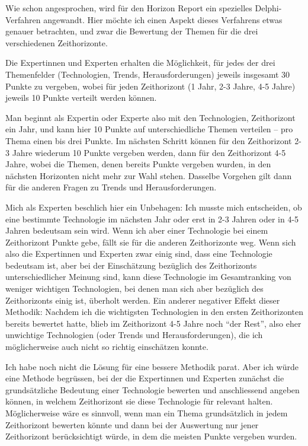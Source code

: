 \documentclass[a4paper,
fontsize=11pt,
oneside,
numbers=noperiodatend,
parskip=half-,
bibliography=totoc,
final
]{scrartcl}
\begin{document}
Wie schon angesprochen, wird für den Horizon Report ein spezielles
Delphi-Verfahren angewandt. Hier möchte ich einen Aspekt dieses
Verfahrens etwas genauer betrachten, und zwar die Bewertung der Themen
für die drei verschiedenen Zeithorizonte.

Die Expertinnen und Experten erhalten die Möglichkeit, für jedes der
drei Themenfelder (Technologien, Trends, Herausforderungen) jeweils
insgesamt 30 Punkte zu vergeben, wobei für jeden Zeithorizont (1 Jahr,
2-3 Jahre, 4-5 Jahre) jeweils 10 Punkte verteilt werden können.~

Man beginnt als Expertin oder Experte also mit den Technologien,
Zeithorizont ein Jahr, und kann hier 10 Punkte auf unterschiedliche
Themen verteilen -- pro Thema einen bis drei Punkte. Im nächsten Schritt
können für den Zeithorizont 2-3 Jahre wiederum 10 Punkte vergeben
werden, dann für den Zeithorizont 4-5 Jahre, wobei die Themen, denen
bereits Punkte vergeben wurden, in den nächsten Horizonten nicht mehr
zur Wahl stehen. Dasselbe Vorgehen gilt dann für die anderen Fragen zu
Trends und Herausforderungen.

Mich als Experten beschlich hier ein Unbehagen: Ich musste mich
entscheiden, ob eine bestimmte Technologie im nächsten Jahr oder erst in
2-3 Jahren oder in 4-5 Jahren bedeutsam sein wird. Wenn ich aber einer
Technologie bei einem Zeithorizont Punkte gebe, fällt sie für die
anderen Zeithorizonte weg. Wenn sich also die Expertinnen und Experten
zwar einig sind, dass eine Technologie bedeutsam ist, aber bei der
Einschätzung bezüglich des Zeithorizonts unterschiedlicher Meinung sind,
kann diese Technologie im Gesamtranking von weniger wichtigen
Technologien, bei denen man sich aber bezüglich des Zeithorizonts einig
ist, überholt werden. Ein anderer negativer Effekt dieser Methodik:
Nachdem ich die wichtigsten Technologien in den ersten Zeithorizonten
bereits bewertet hatte, blieb im Zeithorizont 4-5 Jahre noch
\enquote{der Rest}, also eher unwichtige Technologien (oder Trends und
Herausforderungen), die ich möglicherweise auch nicht so richtig
einschätzen konnte.~

Ich habe noch nicht die Lösung für eine bessere Methodik parat. Aber ich
würde eine Methode begrüssen, bei der die Expertinnen und Experten
zunächst die grundsätzliche Bedeutung einer Technologie bewerten und
anschliessend angeben können, in welchem Zeithorizont sie diese
Technologie für relevant halten. Möglicherweise wäre es sinnvoll, wenn
man ein Thema grundsätzlich in jedem Zeithorizont bewerten könnte und
dann bei der Auswertung nur jener Zeithorizont berücksichtigt würde, in
dem die meisten Punkte vergeben wurden.
\end{document}
